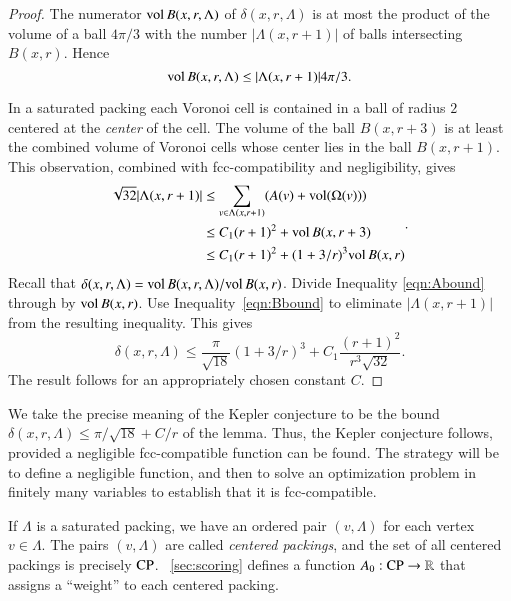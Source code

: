 \begin{proof}
The numerator ${\operatorname{vol}}\, B(x,r,\Lambda)$ of $\delta(x,r,\Lambda)$
is at most the product of the volume of a ball $4\pi/3$ with the
number $|\Lambda(x,r+1)|$ of balls intersecting $B(x,r)$.  Hence
    \begin{equation}
    {\operatorname{vol}}\, B(x,r,\Lambda) \le |\Lambda(x,r+1)| 4\pi/3.
    \label{eqn:Abound}
    \end{equation}

In a saturated packing each Voronoi cell is contained in a ball of
radius $2$ centered at the {\it center} of the cell.  The volume
of the ball $B(x,r+3)$ is at least the combined volume of Voronoi
cells whose center lies in the ball $B(x,r+1)$. This observation,
combined with fcc-compatibility and negligibility, gives
    \begin{equation}
    \begin{split}
    \sqrt{32}|\Lambda(x,r+1)|
    &\le \sum_{v\in\Lambda(x,r+1)} (A(v) +
    {\operatorname{vol}}(\Omega(v))) \\
    &\le C_1 (r+1)^2 + {\operatorname{vol}}\,B(x,r+3) \\
    &\le C_1 (r+1)^2 + (1+3/r)^3 {\operatorname{vol}}\,B(x,r)
    \label{eqn:Bbound}
    \end{split}.
    \end{equation}
Recall that $\delta(x,r,\Lambda)=
{\operatorname{vol}}\,B(x,r,\Lambda)/{\operatorname{vol}}\,B(x,r)$. Divide Inequality
\ref{eqn:Abound} through by ${\operatorname{vol}}\,B(x,r)$.  Use
Inequality~\ref{eqn:Bbound} to eliminate $|\Lambda(x,r+1)|$ from the
resulting inequality.  This gives
    $$\delta(x,r,\Lambda)
        \le \frac{\pi}{\sqrt{18}} (1+3/r)^3 + C_1 \frac{(r+1)^2}{r^3\sqrt{32}}.
    $$
The result follows for an appropriately chosen constant $C$.
\end{proof}

\begin{remark} \label{remark:precise}
We take the precise meaning of the Kepler conjecture to be the
bound $\delta(x,r,\Lambda) \le \pi/\sqrt{18} + C/r$ of the lemma.
Thus, the Kepler conjecture follows, provided a negligible
fcc-compatible function can be found. The strategy will be to
define a negligible function, and then to solve an optimization
problem in finitely many variables to establish that it is
fcc-compatible.
\end{remark}

If $\Lambda$ is a saturated packing, we have an ordered pair
$(v,\Lambda)$ for each vertex $v\in\Lambda$.  The pairs
$(v,\Lambda)$ are called {\it centered packings}, and the
set of all centered packings is precisely ${\operatorname{CP}}$.
%
\Chap~\ref{sec:scoring} defines a function
$A_0:{\operatorname{CP}}\to\mathbb{R}$ that assigns a ``weight'' to each
centered packing.

